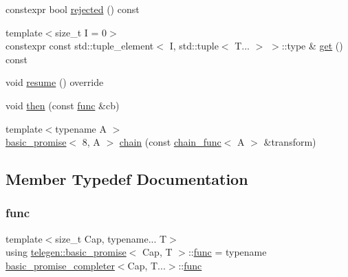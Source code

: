 \begin{DoxyCompactItemize}
constexpr bool \hyperlink{classtelegen_1_1basic__promise_ad31610fb65ecc1c9f9b967c56d47e872}{rejected} () const
\item 
{\footnotesize template$<$size\+\_\+t I = 0$>$ }\\constexpr const std\+::tuple\+\_\+element$<$ I, std\+::tuple$<$ T... $>$ $>$\+::type \& \hyperlink{classtelegen_1_1basic__promise_a8921f7ed33276b0a9c03b9e9df9fe234}{get} () const
\item 
void \hyperlink{classtelegen_1_1basic__promise_a384761b0c7536d6b9ab3dc0f63c7e259}{resume} () override
\item 
void \hyperlink{classtelegen_1_1basic__promise_a29839b535b83410d8bb03d7629570c02}{then} (const \hyperlink{classtelegen_1_1basic__promise_a41bba6927e718eed58a7e6e91db6f6d3}{func} \&cb)
\item 
{\footnotesize template$<$typename A $>$ }\\\hyperlink{classtelegen_1_1basic__promise}{basic\+\_\+promise}$<$ 8, A $>$ \hyperlink{classtelegen_1_1basic__promise_a520a6133513aaa9c7d099c038b5ea8b7}{chain} (const \hyperlink{classstdext_1_1inplace__function}{chain\+\_\+func}$<$ A $>$ \&transform)
\end{DoxyCompactItemize}


\subsection{Member Typedef Documentation}
\mbox{\label{classtelegen_1_1basic__promise_a41bba6927e718eed58a7e6e91db6f6d3}} 
\subsubsection{\texorpdfstring{func}{func}}
{\footnotesize\ttfamily template$<$size\+\_\+t Cap, typename... T$>$ \\
using \hyperlink{classtelegen_1_1basic__promise}{telegen\+::basic\+\_\+promise}$<$ Cap, T $>$\+::\hyperlink{classtelegen_1_1basic__promise_a41bba6927e718eed58a7e6e91db6f6d3}{func} =  typename \hyperlink{classtelegen_1_1basic__promise__completer}{basic\+\_\+promise\+\_\+completer}$<$Cap, T...$>$\+::\hyperlink{classtelegen_1_1basic__promise_a41bba6927e718eed58a7e6e91db6f6d3}{func}}



